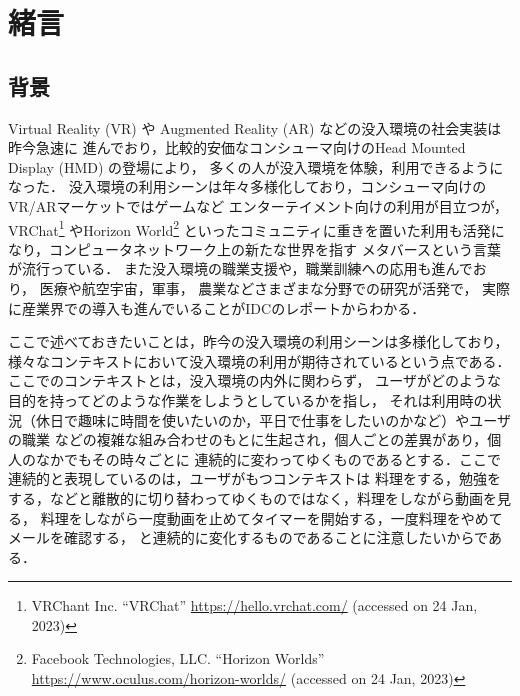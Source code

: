 \chapter{緒言}

\section{背景}
\label{section:background}

Virtual Reality (VR) や Augmented Reality (AR) などの没入環境の社会実装は昨今急速に
進んでおり，比較的安価なコンシューマ向けのHead Mounted Display (HMD) の登場により，
多くの人が没入環境を体験，利用できるようになった．
没入環境の利用シーンは年々多様化しており，コンシューマ向けのVR/ARマーケットではゲームなど
エンターテイメント向けの利用が目立つが，
VRChat\footnote{VRChant Inc. ``VRChat'' \url{https://hello.vrchat.com/} (accessed on 24 Jan, 2023)}
やHorizon World\footnote{Facebook Technologies, LLC. ``Horizon Worlds'' \url{https://www.oculus.com/horizon-worlds/} (accessed on 24 Jan, 2023)}
といったコミュニティに重きを置いた利用も活発になり，コンピュータネットワーク上の新たな世界を指す
メタバースという言葉が流行っている．
また没入環境の職業支援や，職業訓練への応用も進んでおり，
医療\cite{Gallagher2005-gv}や航空宇宙\cite{aerospace}，軍事\cite{military}，
農業\cite{agriculture}などさまざまな分野での研究が活発で，
実際に産業界での導入も進んでいることがIDCのレポート\cite{idc-2022}からわかる．

ここで述べておきたいことは，昨今の没入環境の利用シーンは多様化しており，
様々なコンテキストにおいて没入環境の利用が期待されているという点である．
ここでのコンテキストとは，没入環境の内外に関わらず，
ユーザがどのような目的を持ってどのような作業をしようとしているかを指し，
それは利用時の状況（休日で趣味に時間を使いたいのか，平日で仕事をしたいのかなど）やユーザの職業
などの複雑な組み合わせのもとに生起され，個人ごとの差異があり，個人のなかでもその時々ごとに
連続的に変わってゆくものであるとする．ここで連続的と表現しているのは，ユーザがもつコンテキストは
料理をする，勉強をする，などと離散的に切り替わってゆくものではなく，料理をしながら動画を見る，
料理をしながら一度動画を止めてタイマーを開始する，一度料理をやめてメールを確認する，
と連続的に変化するものであることに注意したいからである．


